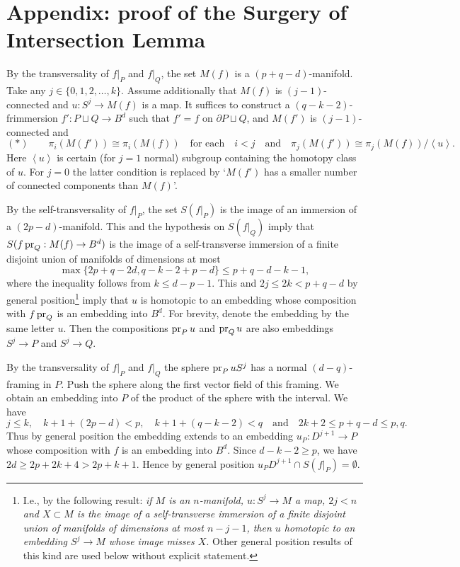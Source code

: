 \documentclass[12pt]{article}
\newcommand{\aronly}[1]{#1}
\def\pr{\mathop{\fam0 pr}}
\theoremstyle{plain}
\theoremstyle{definition}
\begin{document}
\section{Appendix: proof of the Surgery of Intersection Lemma}\label{s:apprsuin}

By the transversality of $f|_P$ and $f|_Q$,
the set $M(f)$ is a $(p+q-d)$-manifold.
Take any $j\in\{0,1,2,\ldots,k\}$.
Assume additionally that $M(f)$ is $(j-1)$-connected and $u:S^j\to M(f)$ is a map.
It suffices to construct a
$(q-k-2)$-frimmersion $f':P\sqcup Q\to B^d$ such that $f'=f$ on $\partial P\sqcup Q$, and $M(f')$ is $(j-1)$-connected and
$$(*)\qquad\pi_i(M(f'))\cong\pi_i(M(f))\quad\text{for each}\quad i<j\quad\text{and}\quad \pi_j(M(f'))\cong\pi_j(M(f))/\left<u\right>.$$
Here $\left<u\right>$ is certain (for $j=1$ normal) subgroup containing the homotopy class of $u$.
For $j=0$ the latter condition is replaced by `$M(f')$ has a smaller number of connected components than $M(f)$'.

By the self-transversality of $f|_P$, the set $S(f|_P)$ is the image of an immersion of a $(2p-d)$-manifold.
This and the hypothesis on $S(f|_Q)$ imply that $S(f\pr_Q:M(f)\to B^d)$ is the image of a self-transverse immersion
of a finite disjoint union of manifolds of dimensions at most
$$\max\{2p+q-2d,q-k-2+p-d\}\le p+q-d-k-1,$$
where the inequality follows from $k\le d-p-1$.
This and $2j\le2k<p+q-d$ by general position\aronly{\footnote{I.e., by the following result: {\it if $M$ is an    $n$-manifold, $u:S^j\to M$ a map, $2j<n$ and $X\subset M$ is the image of a self-transverse immersion of a finite disjoint union of manifolds of dimensions at most $n-j-1$, then $u$ homotopic to an embedding $S^j\to M$ whose image misses $X$}.
Other general position results of this kind are used below without explicit statement.}}
imply that $u$ is homotopic to an embedding whose composition with $f\pr_Q$ is an embedding into $B^d$.
For brevity, denote the embedding by the same letter $u$.
Then the compositions $\pr_Pu$ and $\pr_Qu$ are also embeddings $S^j\to P$ and $S^j\to Q$.

By the transversality of $f|_P$ and $f|_Q$ the sphere $\pr_PuS^j$ has a normal $(d-q)$-framing in $P$.
Push the sphere along the first vector field of this framing.
We obtain an embedding into $P$ of the product of the sphere with the interval.
We have
$$j\le k,\quad k+1+(2p-d)<p,\quad k+1+(q-k-2)<q\quad\text{and}\quad 2k+2\le p+q-d\le p,q.$$
Thus by general position the embedding extends to an embedding  $u_P:D^{j+1}\to P$  whose composition with $f$ is  an embedding into $B^d$.
Since $d-k-2\ge p$, we have $2d\ge 2p+2k+4>2p+k+1$.
Hence by general position $u_PD^{j+1}\cap S(f|_P)=\emptyset$.
\end{document}
